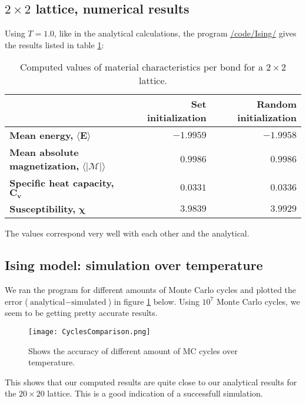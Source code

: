 \documentclass[../main.tex]{subfiles}
\begin{document}
\subsection{$2 \times 2$ lattice, numerical results}
Using $T = 1.0$, like in the analytical calculations, the program \href{https://github.com/kmaasrud/Project-4/tree/master/code/Ising}{/code/Ising/} gives the results listed in table \ref{tab:2x2computed}:
\begin{table}[!h]
  \begin{center}
    \begin{tabular}{| l | r | r |}
      \hline
       & \textbf{Set initialization} & \textbf{Random initialization} \\
      \hline
      \textbf{Mean energy,} $\mathbf{\langle E \rangle}$ & $-1.9959$ & $-1.9958$\\
      \hline
      \textbf{Mean absolute magnetization,} $\mathbf{\langle |\mathcal{M}| \rangle}$ & $0.9986$ & $0.9986$ \\
      \hline
      \textbf{Specific heat capacity,} $\mathbf{C_v}$ & $ 0.0331$ & $0.0336$ \\
      \hline
      \textbf{Susceptibility,} $\mathbf \chi$ & $3.9839$ & $3.9929$ \\
      \hline
    \end{tabular}
    \caption{Computed values of material characteristics per bond for a $2\times 2$ lattice.}
    \label{tab:2x2computed}
  \end{center}
\end{table}
\FloatBarrier
The values correspond very well with each other and the analytical.

\subsection{Ising model: simulation over temperature} \label{sec:res-compareanalytical}
We ran the program for different amounts of Monte Carlo cycles and plotted the error ($\text{analytical} - \text{simulated}$) in figure \ref{fig:results-MCplot} below. Using $10^7$ Monte Carlo cycles, we seem to be getting pretty accurate results.

\begin{figure}[!h]
  \texttt{[image: CyclesComparison.png]}
  \caption{Shows the accuracy of different amount of MC cycles over temperature.}
  \label{fig:results-MCplot}
\end{figure}
\FloatBarrier
This shows that our computed results are quite close to our analytical results for the $20\times 20$ lattice. This is a good indication of a successfull simulation.
\end{document}
